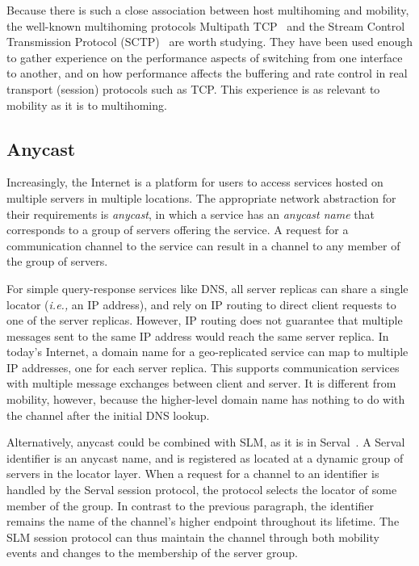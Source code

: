 Because there is such a close association between host multihoming
and mobility, the well-known multihoming protocols
Multipath TCP~\cite{RFC-6824} 
and the Stream Control Transmission Protocol (SCTP)~\cite{RFC-4960}
are worth studying.
They have been used enough to gather experience on the performance
aspects of switching from one interface to another, and on how performance
affects the buffering and rate control in real transport (session)
protocols such as TCP.
This experience is as relevant to mobility as it is to multihoming.

\subsection{Anycast}

Increasingly, the Internet is a platform for users to
access services hosted on multiple servers in multiple locations.
The appropriate network abstraction for their requirements
is {\it anycast},
in which a service has an {\it anycast name} that corresponds
to a group of servers offering the service.
A request for a communication channel to the service can result in a
channel to any member of the group of servers.

For simple query-response services like DNS,
all server replicas can share a single locator ({\it i.e.,} an IP address),
and rely on IP routing to direct client requests to one of the server
replicas.  
However, IP routing does not guarantee that multiple
messages sent to the same IP address would reach the same server
replica. 
In today's Internet, a domain name
for a geo-replicated service
can map to multiple IP addresses, one for each server replica.
This supports communication services with multiple message exchanges
between client and server.
It is different from mobility, however, because the
higher-level domain name has nothing to do with the channel after
the initial DNS lookup.

Alternatively, anycast could be combined with SLM, as it is in
Serval~\cite{serval,serval-icnp}.
A Serval identifier is an anycast name, and is registered as
located at a dynamic group of servers in the locator layer.
When a request for a channel to an identifier is 
handled by the Serval session protocol,
the protocol selects the locator of some member of the
group.
In contrast to the previous paragraph, the identifier remains
the name of the channel's higher endpoint throughout its lifetime.
The SLM session protocol can thus maintain the channel through both
mobility events and changes to the membership of the server group.

